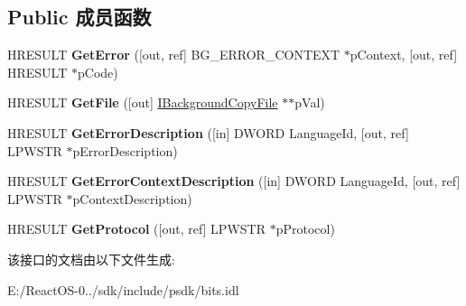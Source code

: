 \subsection*{Public 成员函数}
\begin{DoxyCompactItemize}
\item 
\mbox{\label{interface_i_background_copy_error_aade17836fee70a04f37cdbdfa8efeb15}} 
H\+R\+E\+S\+U\+LT {\bfseries Get\+Error} (\mbox{[}out, ref\mbox{]} B\+G\+\_\+\+E\+R\+R\+O\+R\+\_\+\+C\+O\+N\+T\+E\+XT $\ast$p\+Context, \mbox{[}out, ref\mbox{]} H\+R\+E\+S\+U\+LT $\ast$p\+Code)
\item 
\mbox{\label{interface_i_background_copy_error_ab63cfb7afe090ee7c6f3dd5fccb5bff8}} 
H\+R\+E\+S\+U\+LT {\bfseries Get\+File} (\mbox{[}out\mbox{]} \hyperlink{interface_i_background_copy_file}{I\+Background\+Copy\+File} $\ast$$\ast$p\+Val)
\item 
\mbox{\label{interface_i_background_copy_error_a5e3174c555bff57f68c7325ddc2201b1}} 
H\+R\+E\+S\+U\+LT {\bfseries Get\+Error\+Description} (\mbox{[}in\mbox{]} D\+W\+O\+RD Language\+Id, \mbox{[}out, ref\mbox{]} L\+P\+W\+S\+TR $\ast$p\+Error\+Description)
\item 
\mbox{\label{interface_i_background_copy_error_a674f0f0bc2cf2a6b177482b902dc4cc1}} 
H\+R\+E\+S\+U\+LT {\bfseries Get\+Error\+Context\+Description} (\mbox{[}in\mbox{]} D\+W\+O\+RD Language\+Id, \mbox{[}out, ref\mbox{]} L\+P\+W\+S\+TR $\ast$p\+Context\+Description)
\item 
\mbox{\label{interface_i_background_copy_error_afa228c22756ad48100e8e8b23e4401f5}} 
H\+R\+E\+S\+U\+LT {\bfseries Get\+Protocol} (\mbox{[}out, ref\mbox{]} L\+P\+W\+S\+TR $\ast$p\+Protocol)
\end{DoxyCompactItemize}


该接口的文档由以下文件生成\+:\begin{DoxyCompactItemize}
\item 
E\+:/\+React\+O\+S-\/0../sdk/include/psdk/bits.\+idl\end{DoxyCompactItemize}
